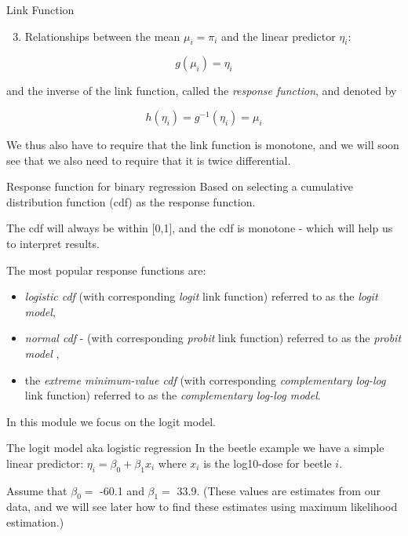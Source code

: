 \documentclass[
  ignorenonframetext,
]{beamer}
\providecommand{\tightlist}{%
  \setlength{\itemsep}{0pt}\setlength{\parskip}{0pt}}
\begin{document}
\begin{frame}
\begin{block}{Link Function}
\label{link-function}
\begin{enumerate}
\setcounter{enumi}{2}
\tightlist
\item
  Relationships between the mean \(\mu_i=\pi_i\) and the linear
  predictor \(\eta_i\):
\end{enumerate}

\[
g(\mu_i)=\eta_i
\]

and the inverse of the link function, called the \emph{response
function}, and denoted by

\[
h(\eta_i)=g^{-1}(\eta_i)=\mu_i
\]

We thus also have to require that the link function is monotone, and we
will soon see that we also need to require that it is twice
differential.
\end{block}
\end{frame}

\begin{frame}
\begin{block}{Response function for binary regression}
\label{response-function-for-binary-regression}
Based on selecting a cumulative distribution function (cdf) as the
response function.

The cdf will always be within {[}0,1{]}, and the cdf is monotone - which
will help us to interpret results.

The most popular response functions are:

\begin{itemize}
\tightlist
\item
  \emph{logistic cdf} (with corresponding \emph{logit} link function)
  referred to as the \emph{logit model},
\item
  \emph{normal cdf} - (with corresponding \emph{probit} link function)
  referred to as the \emph{probit model} ,
\item
  the \emph{extreme minimum-value cdf} (with corresponding
  \emph{complementary log-log} link function) referred to as the
  \emph{complementary log-log model}.
\end{itemize}

In this module we focus on the logit model.
\end{block}
\end{frame}

\begin{frame}
\begin{block}{The logit model aka logistic regression}
\label{the-logit-model-aka-logistic-regression}
In the beetle example we have a simple linear predictor:
\(\eta_i=\beta_0+\beta_1 x_i\) where \(x_i\) is the log10-dose for
beetle \(i\).

Assume that \(\beta_0=\) -60.1 and \(\beta_1=\) 33.9. (These values are
estimates from our data, and we will see later how to find these
estimates using maximum likelihood estimation.)
\end{block}
\end{frame}
\end{document}
